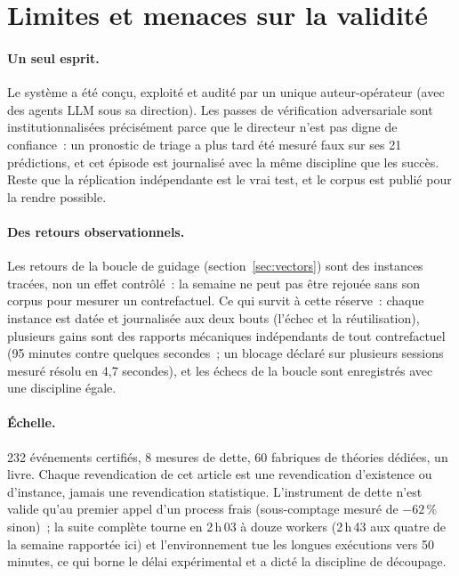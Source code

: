 \documentclass[11pt]{article}
\theoremstyle{remark}\newtheorem{example}{Exemple}
\begin{document}
\section{Limites et menaces sur la validité}
\label{sec:limitations}
\paragraph{Un seul esprit.} Le système a été conçu, exploité et audité par un unique
auteur-opérateur (avec des agents LLM sous sa direction). Les passes de vérification
adversariale sont institutionnalisées précisément parce que le directeur n'est pas
digne de confiance~: un pronostic de triage a plus tard été mesuré faux sur ses
21 prédictions, et cet épisode est journalisé avec la même discipline que les succès.
Reste que la réplication indépendante est le vrai test, et le corpus est publié pour la
rendre possible.

\paragraph{Des retours observationnels.} Les retours de la boucle de guidage
(section~\ref{sec:vectors}) sont des instances tracées, non un effet contrôlé~: la
semaine ne peut pas être rejouée sans son corpus pour mesurer un contrefactuel. Ce qui
survit à cette réserve~: chaque instance est datée et journalisée aux deux bouts
(l'échec et la réutilisation), plusieurs gains sont des rapports mécaniques
indépendants de tout contrefactuel (95 minutes contre quelques secondes~; un blocage déclaré
sur plusieurs sessions mesuré résolu en 4,7 secondes), et les échecs de la boucle sont
enregistrés avec une discipline égale.

\paragraph{Échelle.} 232 événements certifiés, 8 mesures de dette,
60 fabriques de théories dédiées,
un livre. Chaque revendication de cet article est une revendication d'existence ou
d'instance, jamais une revendication statistique. L'instrument de dette n'est valide
qu'au premier appel d'un process frais (sous-comptage mesuré de $-62\,\%$ sinon)~; la
suite complète tourne en 2\,h\,03 à douze workers (2\,h\,43 aux quatre de la semaine rapportée ici) et l'environnement tue les longues
exécutions vers 50 minutes, ce qui borne le délai expérimental et a dicté la discipline
de découpage.
\end{document}

